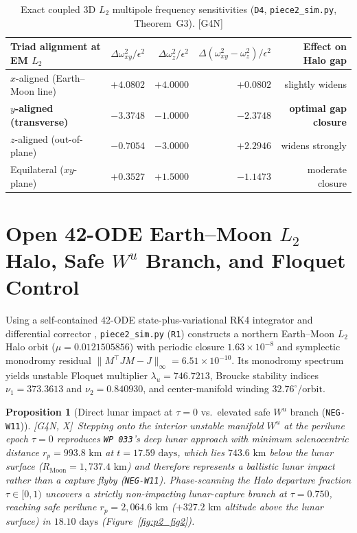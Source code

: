 \documentclass[11pt]{amsart}
\numberwithin{equation}{section}
\theoremstyle{plain}
\newtheorem{proposition}[theorem]{Proposition}
\theoremstyle{definition}\newtheorem{definition}[theorem]{Definition}
\theoremstyle{remark}\newtheorem{remark}[theorem]{Remark}
\newcommand{\ctag}[1]{\textup{\textsf{\scriptsize[#1]}}}
\begin{document}
\begin{table}[htbp]\centering\scriptsize\setlength{\tabcolsep}{3.5pt}
\begin{tabular}{lrrrr}\toprule
Triad alignment at EM $L_2$ & $\Delta\omega_{xy}^2 / \epsilon^2$ & $\Delta\omega_z^2 / \epsilon^2$ & $\Delta(\omega_{xy}^2 - \omega_z^2)/\epsilon^2$ & Effect on Halo gap \\\midrule
$x$-aligned (Earth--Moon line) & $+4.0802$ & $+4.0000$ & $+0.0802$ & slightly widens \\
\textbf{$y$-aligned (transverse)} & \textbf{$-3.3748$} & \textbf{$-1.0000$} & \textbf{$-2.3748$} & \textbf{optimal gap closure} \\
$z$-aligned (out-of-plane) & $-0.7054$ & $-3.0000$ & $+2.2946$ & widens strongly \\
Equilateral ($xy$-plane) & $+0.3527$ & $+1.5000$ & $-1.1473$ & moderate closure \\\bottomrule
\end{tabular}
\caption{Exact coupled 3D $L_2$ multipole frequency sensitivities (\texttt{D4}, \texttt{piece2\_sim.py}, Theorem~G3). \ctag{G4N}}\label{tab:G3}
\end{table}

\section{Open 42-ODE Earth--Moon \texorpdfstring{$L_2$}{L2} Halo, Safe \texorpdfstring{$W^u$}{Wu} Branch, and Floquet Control}
Using a self-contained 42-ODE state-plus-variational RK4 integrator and differential corrector \cite{howell1984,broucke1969,koon2011}, \texttt{piece2\_sim.py} (\texttt{R1}) constructs a northern Earth--Moon $L_2$ Halo orbit ($\mu = 0.0121505856$) with periodic closure $1.63\times 10^{-8}$ and symplectic monodromy residual $\|M^\top J M - J\|_\infty = 6.51\times 10^{-10}$. Its monodromy spectrum yields unstable Floquet multiplier $\lambda_u = 746.7213$, Broucke stability indices $\nu_1 = 373.3613$ and $\nu_2 = 0.840930$, and center-manifold winding $32.76^\circ/\text{orbit}$.

\begin{proposition}[Direct lunar impact at $\tau = 0$ vs.\ elevated safe $W^u$ branch (\texttt{NEG-W11})]\label{prop:Wu}
\ctag{G4N, X}\ Stepping onto the interior unstable manifold $W^u$ at the perilune epoch $\tau = 0$ reproduces \texttt{WP~033}'s deep lunar approach with minimum selenocentric distance $r_p = 993.8\text{ km}$ at $t = 17.59\text{ days}$, which lies $743.6\text{ km}$ \emph{below} the lunar surface ($R_{\mathrm{Moon}} = 1{,}737.4\text{ km}$) and therefore represents a ballistic lunar impact rather than a capture flyby (\texttt{NEG-W11}). Phase-scanning the Halo departure fraction $\tau \in [0, 1)$ uncovers a strictly non-impacting lunar-capture branch at $\tau = 0.750$, reaching safe perilune $r_p = 2{,}064.6\text{ km}$ ($+327.2\text{ km}$ altitude above the lunar surface) in $18.10\text{ days}$ (Figure~\ref{fig:p2_fig2}).
\end{proposition}
\end{document}
